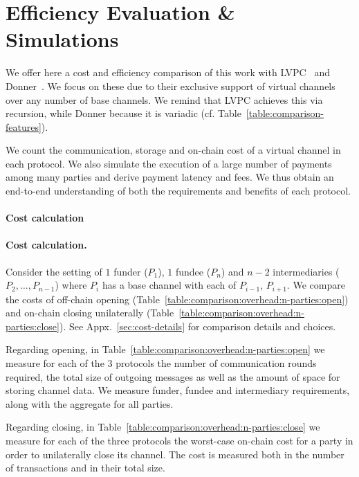 \section{Efficiency Evaluation \& Simulations}
  \label{section:comparison}
  We offer here a cost and efficiency comparison of this work with
  LVPC~\cite{10.1007/978-3-030-65411-5_18} and Donner~\cite{donner}. We focus on
  these due to their exclusive support of
  virtual channels over any number of base channels. We remind that LVPC
  achieves this via recursion, while Donner
  because it is variadic (cf. Table~\ref{table:comparison-features}).

  We count the communication, storage and on-chain cost of a virtual
  channel in each protocol. We also simulate the execution of a large number
  of payments among many parties and derive payment latency and fees. We thus
  obtain an end-to-end understanding of both the requirements and benefits
  of each protocol.

  \makeatletter%
    {\paragraph{Cost calculation}}%
    {\paragraph{Cost calculation.}}%
  \makeatother%
  Consider the setting of $1$
  funder ($P_1$), $1$ fundee ($P_n$) and $n-2$ intermediaries ($P_2, \dots,
  P_{n-1}$) where $P_i$ has a base channel with each of $P_{i-1}$,
  $P_{i+1}$. We compare the costs of off-chain opening
  (Table~\ref{table:comparison:overhead:n-parties:open}) and on-chain
  closing unilaterally
  (Table~\ref{table:comparison:overhead:n-parties:close}). See
  Appx.~\ref{sec:cost-details} for comparison details and choices.

  Regarding opening, in
  Table~\ref{table:comparison:overhead:n-parties:open} we measure for each of
  the $3$ protocols the number of communication rounds required, the total
  size of outgoing messages as well as the amount of space for storing
  channel data. We measure funder, fundee
  and intermediary requirements, along with the aggregate for all parties.

  Regarding closing, in Table~\ref{table:comparison:overhead:n-parties:close} we
  measure for each of the three protocols the worst-case on-chain cost for a party
  in order to unilaterally close its channel. The cost is
  measured both in the number of transactions and in their total size.

